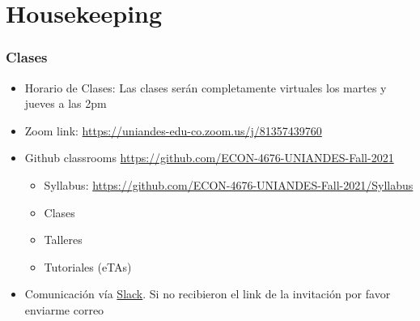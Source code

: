 \documentclass[
  shownotes,
  xcolor={svgnames},
  hyperref={colorlinks,citecolor=DarkBlue,linkcolor=DarkRed,urlcolor=DarkBlue}
  , aspectratio=169]{beamer}
\begin{document}
\section{Housekeeping}
\begin{frame}
\frametitle{Clases}


    \begin{itemize}
      \item Horario de Clases: Las clases serán completamente virtuales los martes y jueves a las 2pm
      \bigskip
      \item Zoom link: \url{https://uniandes-edu-co.zoom.us/j/81357439760}
      \bigskip
      \item Github classrooms \url{https://github.com/ECON-4676-UNIANDES-Fall-2021}
      \begin{itemize}
        \item Syllabus: \url{https://github.com/ECON-4676-UNIANDES-Fall-2021/Syllabus}
        \item Clases
        \item Talleres
        \item Tutoriales (eTAs)
        \end{itemize}
      \bigskip
      \item Comunicación vía \href{https://slack.com/}{Slack}. Si no recibieron el link de la invitación por favor enviarme correo
    \end{itemize}


\end{frame}

\end{document}
